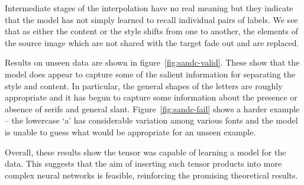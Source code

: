 Intermediate stages of the interpolation have no real meaning but they indicate that the model has
not simply learned to recall individual pairs of labels. We see that as either the content or
the style shifts from one to another, the elements of the source image which are not shared with
the target fade out and are replaced.

Results on unseen data are shown in figure~\ref{fig:sandc-valid}. These show that the model does
appear to capture some of the salient information for separating the style and content. In
particular, the general shapes of the letters are roughly appropriate and it has begun to capture
some information about the presence or absence of serifs and general slant.
Figure~\ref{fig:sandc-fail} shows a harder example -- the lowercase `a' has considerable variation
among various fonts and the model is unable to guess what would be appropriate for an unseen
example. 

Overall, these results show the tensor was capable of learning a model for the data.
This suggests that the aim of inserting such tensor products into more complex neural networks
is feasible, reinforcing the promising theoretical results.


